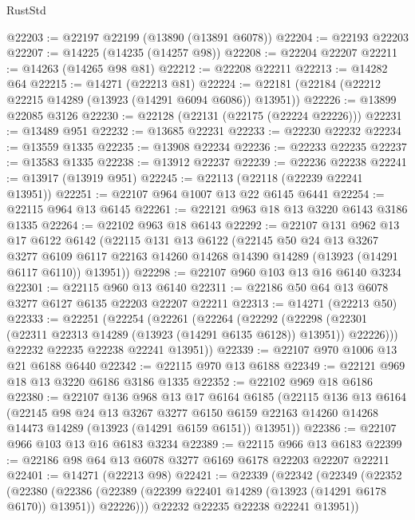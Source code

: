 \begin{lexlean}{RustStd}
\begin{coremodule}
@22203 := @22197 @22199 (@13890 (@13891 @6078))
@22204 := @22193 @22203
@22207 := @14225 (@14235 (@14257 @98))
@22208 := @22204 @22207
@22211 := @14263 (@14265 @98 @81)
@22212 := @22208 @22211
@22213 := @14282 @64
@22215 := @14271 (@22213 @81)
@22224 := @22181 (@22184 (@22212 @22215 @14289 (@13923 (@14291 @6094 @6086)) @13951))
@22226 := @13899 @22085 @3126
@22230 := @22128 (@22131 (@22175 (@22224 @22226)))
@22231 := @13489 @951
@22232 := @13685 @22231
@22233 := @22230 @22232
@22234 := @13559 @1335
@22235 := @13908 @22234
@22236 := @22233 @22235
@22237 := @13583 @1335
@22238 := @13912 @22237
@22239 := @22236 @22238
@22241 := @13917 (@13919 @951)
@22245 := @22113 (@22118 (@22239 @22241 @13951))
@22251 := @22107 @964 @1007 @13 @22 @6145 @6441
@22254 := @22115 @964 @13 @6145
@22261 := @22121 @963 @18 @13 @3220 @6143 @3186 @1335
@22264 := @22102 @963 @18 @6143
@22292 := @22107
    @131
    @962
    @13
    @17
    @6122
    @6142
    (@22115
      @131
      @13
      @6122
      (@22145
        @50
        @24
        @13
        @3267
        @3277
        @6109
        @6117
        @22163
        @14260
        @14268
        @14390
        @14289
        (@13923 (@14291 @6117 @6110))
        @13951))
@22298 := @22107 @960 @103 @13 @16 @6140 @3234
@22301 := @22115 @960 @13 @6140
@22311 := @22186 @50 @64 @13 @6078 @3277 @6127 @6135 @22203 @22207 @22211
@22313 := @14271 (@22213 @50)
@22333 := @22251
    (@22254
      (@22261
        (@22264
          (@22292
            (@22298 (@22301 (@22311 @22313 @14289 (@13923 (@14291 @6135 @6128)) @13951)) @22226)))
        @22232
        @22235
        @22238
        @22241
        @13951))
@22339 := @22107 @970 @1006 @13 @21 @6188 @6440
@22342 := @22115 @970 @13 @6188
@22349 := @22121 @969 @18 @13 @3220 @6186 @3186 @1335
@22352 := @22102 @969 @18 @6186
@22380 := @22107
    @136
    @968
    @13
    @17
    @6164
    @6185
    (@22115
      @136
      @13
      @6164
      (@22145
        @98
        @24
        @13
        @3267
        @3277
        @6150
        @6159
        @22163
        @14260
        @14268
        @14473
        @14289
        (@13923 (@14291 @6159 @6151))
        @13951))
@22386 := @22107 @966 @103 @13 @16 @6183 @3234
@22389 := @22115 @966 @13 @6183
@22399 := @22186 @98 @64 @13 @6078 @3277 @6169 @6178 @22203 @22207 @22211
@22401 := @14271 (@22213 @98)
@22421 := @22339
    (@22342
      (@22349
        (@22352
          (@22380
            (@22386 (@22389 (@22399 @22401 @14289 (@13923 (@14291 @6178 @6170)) @13951)) @22226)))
        @22232
        @22235
        @22238
        @22241
        @13951))

\end{coremodule}
\end{lexlean}
